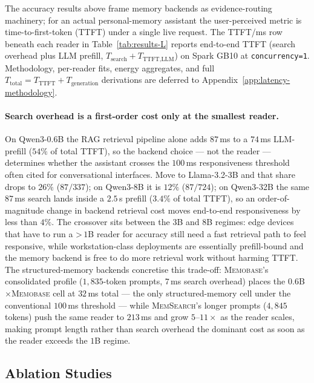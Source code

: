 The accuracy results above frame memory backends as evidence-routing
machinery; for an actual personal-memory assistant the user-perceived
metric is time-to-first-token (TTFT) under a single live request. The
TTFT/ms row beneath each reader in Table~\ref{tab:results-L} reports
end-to-end TTFT (search overhead plus LLM prefill,
$T_{\text{search}} + T_{\text{TTFT,LLM}}$) on Spark GB10 at
\texttt{concurrency=1}. Methodology, per-reader fits, energy aggregates,
and full $T_{\text{total}} = T_{\text{TTFT}} + T_{\text{generation}}$
derivations are deferred to Appendix~\ref{app:latency-methodology}.

\paragraph{Search overhead is a first-order cost only at the smallest reader.}
On Qwen3-0.6B the \textsc{RAG} retrieval pipeline alone adds $87$\,ms to a
$74$\,ms LLM-prefill ($54\%$ of total TTFT), so the backend choice ---
not the reader --- determines whether the assistant crosses the $100$\,ms
responsiveness threshold often cited for conversational interfaces. Move
to Llama-3.2-3B and that share drops to $26\%$ ($87/337$); on Qwen3-8B it
is $12\%$ ($87/724$); on Qwen3-32B the same $87$\,ms search lands inside a
$2.5$\,s prefill ($3.4\%$ of total TTFT), so an order-of-magnitude change
in backend retrieval cost moves end-to-end responsiveness by less than
$4\%$. The crossover sits between the $3$B and $8$B regimes: edge devices
that have to run a \textgreater\,$1$B reader for accuracy still need a
fast retrieval path to feel responsive, while workstation-class
deployments are essentially prefill-bound and the memory backend is free
to do more retrieval work without harming TTFT. The structured-memory
backends concretise this trade-off: \textsc{Memobase}'s consolidated
profile ($1{,}835$-token prompts, $7$\,ms search overhead) places the
$0.6$B$\times$\textsc{Memobase} cell at $32$\,ms total --- the only
structured-memory cell under the conventional $100$\,ms threshold ---
while \textsc{MemSearch}'s longer prompts ($4{,}845$ tokens) push the same
reader to $213$\,ms and grow $5$--$11{\times}$ as the reader scales,
making prompt length rather than search overhead the dominant cost as
soon as the reader exceeds the $1$B regime.

\subsection{Ablation Studies}
\label{sec:ablation-studies}

